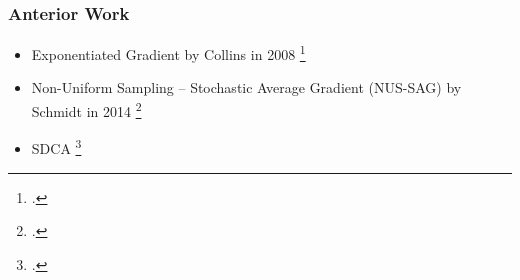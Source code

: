 \documentclass{beamer}
\DeclareMathOperator{\1}{\mathbb{1}}
\begin{document}
\begin{frame}[fragile]
	\frametitle{Anterior Work}
	\begin{itemize}
		\item Exponentiated Gradient by Collins in 2008 \footcite{collins_exponentiated_2008}
		\item Non-Uniform Sampling -- Stochastic Average Gradient (NUS-SAG) by Schmidt in 2014 \footcite{schmidt_non-uniform_2015}
		\item<2-> SDCA \footcite{shalev-shwartz_accelerated_2013-1}
	\end{itemize}


\begin{center}
	\bigskip
	\bigskip
\end{center}




\end{frame}
%
%
%
%
%
%
%
\end{document}

